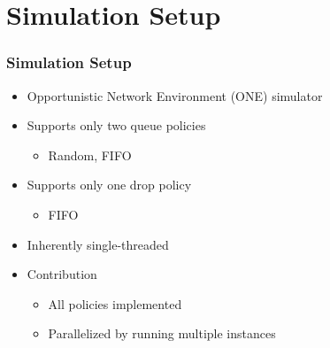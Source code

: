 \section{Simulation Setup}


\begin{frame}
  \frametitle{Simulation Setup}  
  \begin{itemize}
    \item Opportunistic Network Environment (ONE) simulator
    \vspace{0.3cm}
    \item Supports only two queue policies
	\begin{itemize}
      \item Random, FIFO
    \end{itemize}  
    \vspace{0.3cm}
    \item Supports only one drop policy
	\begin{itemize}
      \item FIFO
    \end{itemize} 
	\vspace{0.3cm}
	\item Inherently single-threaded
	\vspace{0.3cm}
	\item Contribution
	\begin{itemize}
      \item All policies implemented
      \item Parallelized by running multiple instances
    \end{itemize} 
  \end{itemize}     
\end{frame}

